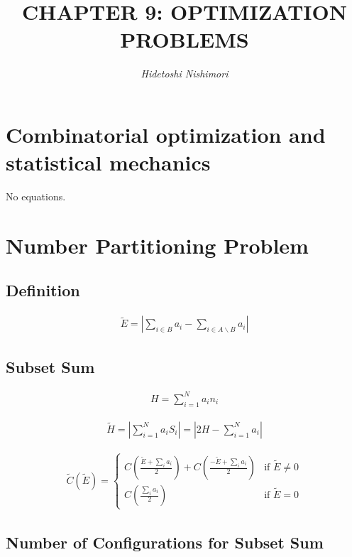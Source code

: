 \documentclass{article}
\title{\LARGE\scshape\MakeUppercase{Chapter 9: Optimization problems}}
\author{\textit{Hidetoshi Nishimori}}
\date{}
\begin{document}
\maketitle
\section{Combinatorial optimization and statistical mechanics}

No equations.

\section{Number Partitioning Problem}

\subsection{Definition}

\begin{align*}
\tilde{E} = \left| \sum_{i \in B} a_i - \sum_{i \in A \backslash B} a_i \right| \tag{9.1}
\end{align*}

\subsection{Subset Sum}

\begin{align*}
H = \sum_{i=1}^{N} a_i n_i \tag{9.2}
\end{align*}

\begin{align*}
\tilde{H} = \left| \sum_{i=1}^{N} a_i S_i \right| = \left| 2H - \sum_{i=1}^{N} a_i \right| \tag{9.3}
\end{align*}

\begin{align*}
\tilde{C}(\tilde{E}) = 
\begin{cases}
    C\left( \frac{\tilde{E} + \sum_{i} a_i}{2} \right) + C\left( \frac{-\tilde{E} + \sum_{i} a_i}{2} \right) & \text{if } \tilde{E} \neq 0 \\
    C\left( \frac{\sum_{i} a_i}{2} \right) & \text{if } \tilde{E} = 0
\end{cases} \tag{9.4}
\end{align*}

\subsection{Number of Configurations for Subset Sum}
\end{document}
